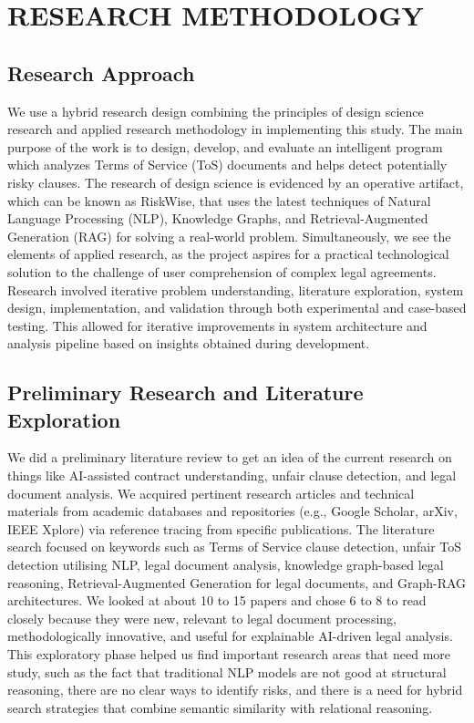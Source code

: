 \chapter{RESEARCH METHODOLOGY}
\label{ChapterResearchMethodology}

\section{Research Approach}
We use a hybrid research design combining the principles of design
science research and applied research methodology in implementing
this study. The main purpose of the work is to design, develop, and
evaluate an intelligent program which analyzes Terms of Service (ToS)
documents and helps detect potentially risky clauses. The research of
design science is evidenced by an operative artifact, which can be
known as RiskWise, that uses the latest techniques of Natural
Language Processing (NLP), Knowledge Graphs, and Retrieval-Augmented
Generation (RAG) for solving a real-world problem. Simultaneously, we
see the elements of applied research, as the project aspires for a
practical technological solution to the challenge of user
comprehension of complex legal agreements. Research involved
iterative problem understanding, literature exploration, system
design, implementation, and validation through both experimental and
case-based testing. This allowed for iterative improvements in system
architecture and analysis pipeline based on insights obtained during
development.

\section{Preliminary Research and Literature Exploration}
We did a preliminary literature review to get an idea of the current
research on things like AI-assisted contract understanding, unfair
clause detection, and legal document analysis. We acquired pertinent
research articles and technical materials from academic databases and
repositories (e.g., Google Scholar, arXiv, IEEE Xplore) via reference
tracing from specific publications. The literature search focused on
keywords such as Terms of Service clause detection, unfair ToS
detection utilising NLP, legal document analysis, knowledge
graph-based legal reasoning, Retrieval-Augmented Generation for legal
documents, and Graph-RAG architectures. We looked at about 10 to 15
papers and chose 6 to 8 to read closely because they were new,
relevant to legal document processing, methodologically innovative,
and useful for explainable AI-driven legal analysis.
\\
This exploratory phase helped us find important research areas that
need more study, such as the fact that traditional NLP models are not
good at structural reasoning, there are no clear ways to identify
risks, and there is a need for hybrid search strategies that combine
semantic similarity with relational reasoning.

